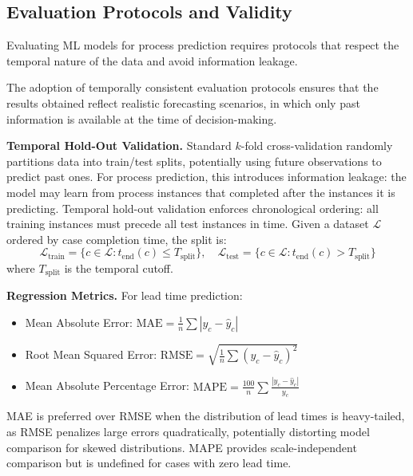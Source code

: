 \subsection{Evaluation Protocols and Validity}
\label{sec:ml-eval}

Evaluating ML models for process prediction requires protocols that
respect the temporal nature of the data and avoid information leakage.

The adoption of temporally consistent evaluation protocols ensures that the results obtained reflect realistic forecasting scenarios, in which only past information is available at the time of decision-making.

\textbf{Temporal Hold-Out Validation.} Standard $k$-fold cross-validation
randomly partitions data into train/test splits, potentially using future
observations to predict past ones. For process prediction, this introduces
information leakage: the model may learn from process instances that
completed after the instances it is predicting. Temporal hold-out
validation enforces chronological ordering: all training instances must
precede all test instances in time. Given a dataset $\mathcal{L}$ ordered
by case completion time, the split is:
\begin{equation}
\label{eq:temporal-split}
\mathcal{L}_{\text{train}} = \{c \in \mathcal{L} : t_{\text{end}}(c)
\leq T_{\text{split}}\}, \quad
\mathcal{L}_{\text{test}} = \{c \in \mathcal{L} : t_{\text{end}}(c)
> T_{\text{split}}\}
\end{equation}
where $T_{\text{split}}$ is the temporal cutoff.

\textbf{Regression Metrics.} For lead time prediction:

\begin{itemize}
    \item Mean Absolute Error:
    $\text{MAE} = \frac{1}{n}\sum|y_c - \hat{y}_c|$
    \item Root Mean Squared Error:
    $\text{RMSE} = \sqrt{\frac{1}{n}\sum(y_c - \hat{y}_c)^2}$
    \item Mean Absolute Percentage Error:
    $\text{MAPE} = \frac{100}{n}\sum\frac{|y_c - \hat{y}_c|}{y_c}$
\end{itemize}

MAE is preferred over RMSE when the distribution of lead times is
heavy-tailed, as RMSE penalizes large errors quadratically, potentially
distorting model comparison for skewed distributions. MAPE provides
scale-independent comparison but is undefined for cases with zero lead
time.

